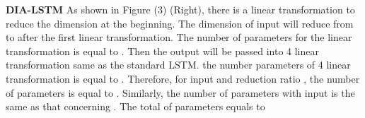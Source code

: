 \documentclass[letterpaper]{article} \usepackage{aaai20}  \usepackage{times}  \usepackage{helvet} \usepackage{courier}  \usepackage[hyphens]{url}  \usepackage{graphicx} \urlstyle{rm} \def\UrlFont{\rm}  \usepackage{graphicx}  \frenchspacing  \setlength{\pdfpagewidth}{8.5in}  \setlength{\pdfpageheight}{11in}  \usepackage{color}
\begin{document}
	\textbf{DIA-LSTM} As shown in Figure (3) (Right), there is a linear transformation to reduce the dimension at the beginning. The dimension of input  will reduce from  to  after the first linear transformation. The number of parameters for the linear transformation is equal to . Then the output will be passed into 4 linear transformation same as the standard LSTM. the number parameters of 4 linear transformation is equal to . Therefore, for input  and reduction ratio , the number of parameters is equal to . Similarly, the number of parameters with input  is the same as that concerning . The total of parameters equals to 
	
\end{document}
